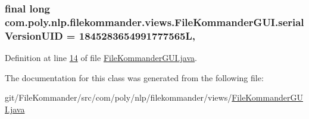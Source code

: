 \hypertarget{classcom_1_1poly_1_1nlp_1_1filekommander_1_1views_1_1_file_kommander_g_u_i_ab0ab424f45066afa9f00b5b45d2ddbcf}{
\subsubsection[{serial\-Version\-U\-I\-D}]{\setlength{\rightskip}{0pt plus 5cm}final long com.\-poly.\-nlp.\-filekommander.\-views.\-File\-Kommander\-G\-U\-I.\-serial\-Version\-U\-I\-D = 1845283654991777565\-L\hspace{0.3cm}{\ttfamily [static]}, {\ttfamily [private]}}}\label{classcom_1_1poly_1_1nlp_1_1filekommander_1_1views_1_1_file_kommander_g_u_i_ab0ab424f45066afa9f00b5b45d2ddbcf}


Definition at line \hyperlink{L14}{14} of file \hyperlink{}{File\-Kommander\-G\-U\-I.\-java}.



The documentation for this class was generated from the following file\-:\begin{DoxyCompactItemize}
\item 
git/\-File\-Kommander/src/com/poly/nlp/filekommander/views/\hyperlink{_file_kommander_g_u_i_8java}{File\-Kommander\-G\-U\-I.\-java}\end{DoxyCompactItemize}
